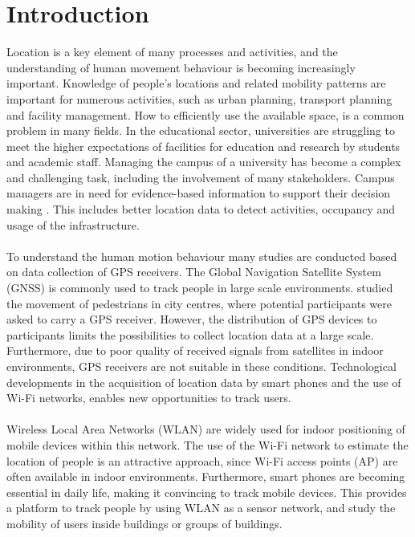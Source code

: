 \section{Introduction}\label{1-introduction}
Location is a key element of many processes and activities, and the understanding of human movement behaviour is becoming increasingly important. Knowledge of people’s locations and related mobility patterns are important for numerous activities, such as urban planning, transport planning and facility management. How to efficiently use the available space, is a common problem in many fields. In the educational sector, universities are struggling to meet the higher expectations of facilities for education and research by students and academic staff. Managing the campus of a university has become a complex and challenging task, including the involvement of many stakeholders. Campus managers are in need for evidence-based information to support their decision making \cite{heijer2012campus}.  This includes better location data to detect activities, occupancy and usage of the infrastructure.
\\\\
To understand the human motion behaviour many studies are conducted based on data collection of GPS receivers. The Global Navigation Satellite System (GNSS) is commonly used to track people in large scale environments. \cite{spek2008tracking} studied the movement of pedestrians in city centres, where potential participants were asked to carry a GPS receiver. However, the distribution of GPS devices to participants limits the possibilities to collect location data at a large scale. Furthermore, due to poor quality of received signals from satellites in indoor environments, GPS receivers are not suitable in these conditions. Technological developments in the acquisition of location data by smart phones and the use of Wi-Fi networks, enables new opportunities to track users. 
\\\\
Wireless Local Area Networks (WLAN) are widely used for indoor positioning of mobile devices within this network. The use of the Wi-Fi network to estimate the location of people is an attractive approach, since Wi-Fi access points (AP) are often available in indoor environments. Furthermore, smart phones are becoming essential in daily life, making it convincing to track mobile devices. This provides a platform to track people by using WLAN as a sensor network, and study the mobility of users inside buildings or groups of buildings. 

